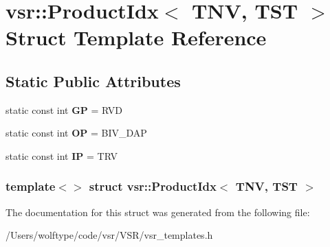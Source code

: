 \hypertarget{structvsr_1_1_product_idx_3_01_t_n_v_00_01_t_s_t_01_4}{\section{vsr\-:\-:Product\-Idx$<$ T\-N\-V, T\-S\-T $>$ Struct Template Reference}
\label{structvsr_1_1_product_idx_3_01_t_n_v_00_01_t_s_t_01_4}
}
\subsection*{Static Public Attributes}
\begin{DoxyCompactItemize}
\item 
\hypertarget{structvsr_1_1_product_idx_3_01_t_n_v_00_01_t_s_t_01_4_a92e852d4493cf916ffa2618f70cb8ac5}{static const int {\bfseries G\-P} = R\-V\-D}\label{structvsr_1_1_product_idx_3_01_t_n_v_00_01_t_s_t_01_4_a92e852d4493cf916ffa2618f70cb8ac5}

\item 
\hypertarget{structvsr_1_1_product_idx_3_01_t_n_v_00_01_t_s_t_01_4_a926d8ee9b4b4089466826c050e2d73fd}{static const int {\bfseries O\-P} = B\-I\-V\-\_\-\-D\-A\-P}\label{structvsr_1_1_product_idx_3_01_t_n_v_00_01_t_s_t_01_4_a926d8ee9b4b4089466826c050e2d73fd}

\item 
\hypertarget{structvsr_1_1_product_idx_3_01_t_n_v_00_01_t_s_t_01_4_a8feffc71ac70b3fcecafd7936257e6fa}{static const int {\bfseries I\-P} = T\-R\-V}\label{structvsr_1_1_product_idx_3_01_t_n_v_00_01_t_s_t_01_4_a8feffc71ac70b3fcecafd7936257e6fa}

\end{DoxyCompactItemize}
\subsubsection*{template$<$$>$ struct vsr\-::\-Product\-Idx$<$ T\-N\-V, T\-S\-T $>$}



The documentation for this struct was generated from the following file\-:\begin{DoxyCompactItemize}
\item 
/\-Users/wolftype/code/vsr/\-V\-S\-R/vsr\-\_\-templates.\-h\end{DoxyCompactItemize}
